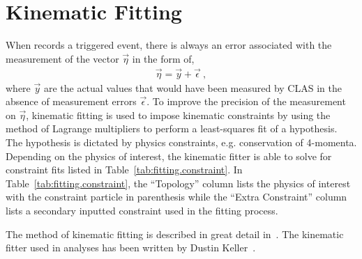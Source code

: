 \section{Kinematic Fitting}\label{sec:analysis.fitting}
When  records a triggered event, there is always an error associated with the measurement of the vector $\vec{\eta}$ in the form of,
\begin{align}
\vec{\eta}  = \vec{y} + \vec{\epsilon} \ ,
\end{align}
where $\vec{y}$ are the actual values that would have been measured by CLAS in the absence of measurement errors $\vec{\epsilon}$. To improve the precision of the measurement on $\vec{\eta}$, kinematic fitting is used to impose kinematic constraints by using the method of Lagrange multipliers to perform a least-squares fit of a hypothesis. The hypothesis is dictated by physics constraints, e.g. conservation of 4-momenta. Depending on the physics of interest, the kinematic fitter is able to solve for constraint fits listed in Table~\ref{tab:fitting.constraint}. In Table~\ref{tab:fitting.constraint}, the ``Topology'' column lists the physics of interest with the constraint particle in parenthesis while the ``Extra Constraint'' column lists a secondary inputted constraint used in the fitting process. 

The method of kinematic fitting is described in great detail in~\cite{dustin.kinfit}. The kinematic fitter used in  analyses has been written by Dustin Keller~\cite{dustin.kinfit}.
% 
